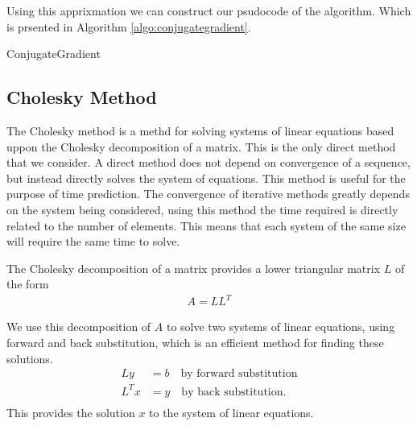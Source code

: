 \documentclass[../fem.tex]{subfiles}
\begin{document}
Using this apprixmation we can construct our psudocode of the algorithm. Which
is prsented in Algorithm \ref{algo:conjugategradient}.

\begin{algorithm}[H]
  \caption{ConjugateGradient}\label{algo:conjugategradient}
  \begin{algorithmic}
    \Else
    \EndIf
    \EndIf
    \EndFor
  \end{algorithmic}
\end{algorithm}

\subsection{Cholesky Method}%
\label{sub:cholesky_method}

The Cholesky method is a methd for solving systems of linear equations based
uppon the Cholesky decomposition of a matrix. This is the only direct method
that we consider. A direct method does not depend on convergence of a sequence,
but instead directly solves the system of equations. This method is useful for
the purpose of time prediction. The convergence of iterative methods greatly
depends on the system being considered, using this method the time required is
directly related to the number of elements. This means that each system of the
same size will require the same time to solve.

\begin{Figure}
   \begin{center}
     
   \end{center}
   \label{fig:ch_time}
\end{Figure}

The Cholesky decomposition of a matrix provides a lower triangular matrix $L$
of the form
\begin{align*}
   A=LL^T
\end{align*}

We use this decomposition of $A$ to solve two systems of linear equations,
using forward and back substitution, which is an efficient method for finding
these solutions.
\begin{align*}
  Ly&=b\quad\text{by forward substitution}\\
  L^Tx&=y\quad\text{by back substitution}.\\
\end{align*}
This provides the solution $x$ to the system of linear equations.
\end{document}
